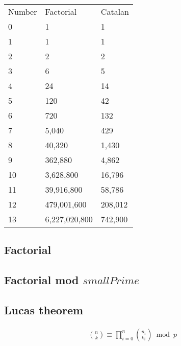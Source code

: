 \newpage


\begin{tabular}{ |p{1cm}|p{3cm}|p{3cm}|  }
  \hline  
  \rowcolor{Blue} 
  \multicolumn{3}{|c|}{Combinatorics table} \\ \hline
  \rowcolor{LightBlue2} 
  Number & Factorial & Catalan \\ \hline
  0 & 1 & 1 \\ \hline
  \rowcolor{Gray} 
  1 & 1 & 1 \\ \hline
  2 & 2 & 2 \\ \hline
  \rowcolor{Gray} 
  3 & 6 & 5 \\ \hline
  4 & 24 & 14 \\ \hline
  \rowcolor{Gray} 
  5 & 120 & 42 \\ \hline
  6 & 720 & 132 \\ \hline
  \rowcolor{Gray} 
  7 & 5,040 & 429 \\ \hline
  8 & 40,320 & 1,430 \\ \hline
  \rowcolor{Gray} 
  9 & 362,880 & 4,862 \\ \hline
  10 & 3,628,800 & 16,796 \\ \hline
  \rowcolor{Gray} 
  11 & 39,916,800 & 58,786 \\ \hline
  12 & 479,001,600 & 208,012 \\ \hline
  \rowcolor{Gray} 
  13 & 6,227,020,800 & 742,900 \\ \hline
\end{tabular}
\vspace{-5pt}

\subsection{Factorial} 

\subsection{Factorial mod $smallPrime$} 

\subsection{Lucas theorem}
\begin{gather*}
\binom{n}{k} \equiv \prod_{i = 0}^{n}\binom{n_i}{k_i} \bmod{p}
\end{gather*}
\vspace{-15pt}

